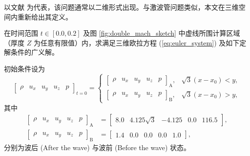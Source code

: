 以文献 \cite{Woodward_1984} 为代表，该问题通常以二维形式出现。与激波管问题类似，本文在三维空间内重新给出其定义。
\begin{problem}
[双马赫反射]\label{prob:=0053CC=009A6C=008D6B=0053CD=005C04}在时间范围
$t\in[0.0,0.2]$ 及图 \ref{fig:double_mach_sketch} 中虚线所围计算区域（厚度 $Z$
为任意有限值）内，求满足三维欧拉方程 (\ref{eq:euler_system}) 及如下定解条件的广义解。

初始条件设为
\begin{equation}
\begin{bmatrix}\rho & u_{x} & u_{y} & u_{z} & p\end{bmatrix}_{t=0}=\begin{cases}
\begin{bmatrix}\rho & u_{x} & u_{y} & u_{z} & p\end{bmatrix}_{\mathrm{A}}, & \sqrt{3}(x-x_{0})<y,\\
\begin{bmatrix}\rho & u_{x} & u_{y} & u_{z} & p\end{bmatrix}_{\mathrm{B}}, & \sqrt{3}(x-x_{0})>y,
\end{cases}\label{eq:double_mach_ic}
\end{equation}
其中
\begin{equation}
\begin{aligned}\begin{bmatrix}\rho & u_{x} & u_{y} & u_{z} & p\end{bmatrix}_{\mathrm{A}} & =\begin{bmatrix}8.0 & 4.125\sqrt{3} & -4.125 & 0.0 & 116.5\end{bmatrix},\\
\begin{bmatrix}\rho & u_{x} & u_{y} & u_{z} & p\end{bmatrix}_{\mathrm{B}} & =\begin{bmatrix}1.4 & 0.0 & 0.0 & 0.0 & 1.0\end{bmatrix},
\end{aligned}
\end{equation}
分别为波后 (After the wave) 与波前 (Before the wave) 状态。


\end{problem}

